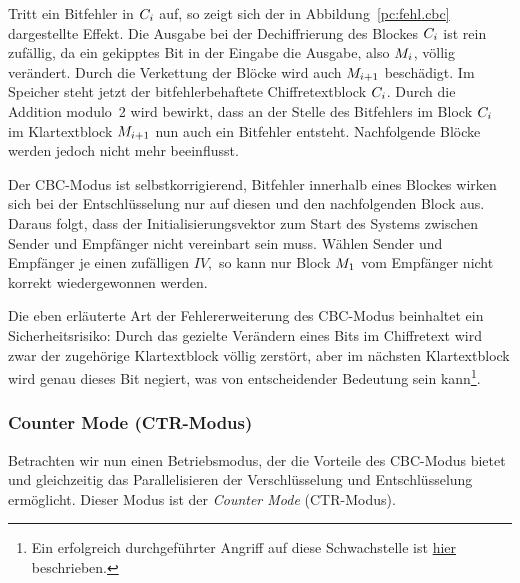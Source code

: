 Tritt ein Bitfehler in $C_i$ auf, so zeigt sich der in
Abbildung~\ref{pc:fehl.cbc} dargestellte Effekt. Die Ausgabe bei der
Dechiffrierung des Blockes $C_i$ ist rein zufällig, da ein
gekipptes Bit in der Eingabe die Ausgabe, also $M_i$, völlig
verändert.  Durch die Verkettung der Blöcke wird auch $M_{i+1}$
beschädigt. Im Speicher steht jetzt der bitfehlerbehaftete
Chiffretextblock $C_i$.  Durch die Addition modulo~2 wird
bewirkt, dass an der Stelle des Bitfehlers im Block $C_i$ im
Klartextblock $M_{i+1}$ nun auch ein Bitfehler entsteht.
Nachfolgende Blöcke werden jedoch nicht mehr beeinflusst.

Der CBC-Modus ist selbstkorrigierend, Bitfehler innerhalb eines Blockes
wirken sich bei der Entschlüsselung nur auf diesen und den nachfolgenden
Block aus. Daraus folgt, dass der Initialisierungsvektor zum Start des
Systems zwischen Sender und Empfänger nicht vereinbart sein muss. Wählen
Sender und Empfänger je einen zufälligen $IV,$ so kann nur Block
$M_1$ vom Empfänger nicht korrekt wiedergewonnen werden.

Die eben erläuterte Art der Fehlererweiterung des CBC-Modus beinhaltet
ein Sicherheitsrisiko: Durch das gezielte Verändern eines Bits im
Chiffretext wird zwar der zugehörige Klartextblock völlig zerstört, aber
im nächsten Klartextblock wird genau dieses Bit negiert, was von
entscheidender Bedeutung sein kann\footnote{Ein erfolgreich
durchgeführter Angriff auf diese Schwachstelle ist
\href{http://www.jakoblell.com/blog/2013/12/22/practical-malleability-attack-against-cbc-encrypted-luks-partitions/}{hier}
beschrieben.}.

\subsubsection{Counter Mode (CTR-Modus)}\label{sssec:ctr} Betrachten wir
nun einen Betriebsmodus, der die Vorteile des CBC-Modus bietet und
gleichzeitig das Parallelisieren der Verschlüsselung und Entschlüsselung
ermöglicht. Dieser Modus ist der \emph{Counter Mode}
(CTR-Modus)\indexCTR.

